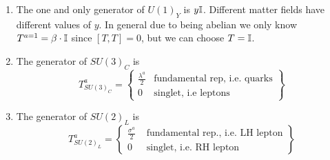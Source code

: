 \begin{enumerate}
	\item The one and only generator of $U(1)_Y$ is $y\mathbb{I}$. Different matter fields have different values of $y$. In general due to being abelian we only know $T^{a=1}=\beta \cdot \mathbb{I}$ since $[T,T]=0$, but we can choose $ T=\mathbb{I}$.
	\item The generator of $SU(3)_C$ is 
	\begin{equation}
		T^a_{SU(3)_C} = \left\{ \begin{array}{ll}
		\frac{\lambda^a}{2} & \text{fundamental rep, i.e. quarks}\\
		0 & \text{singlet, i.e leptons}
		\end{array}		
		\right\}
	\end{equation}
	\item The generator of $SU(2)_L$ is 
	\begin{equation}
		T^a_{SU(2)_L} = \left\{ \begin{array}{ll}
		\frac{\sigma^a}{2}& \text{ fundamental rep., i.e. LH lepton}\\
		0 & \text{ singlet, i.e. RH lepton}
		\end{array}
		\right\}
	\end{equation}
\end{enumerate}

 
 
 
 
 
 
 
 
 
 
 
 
 
 
